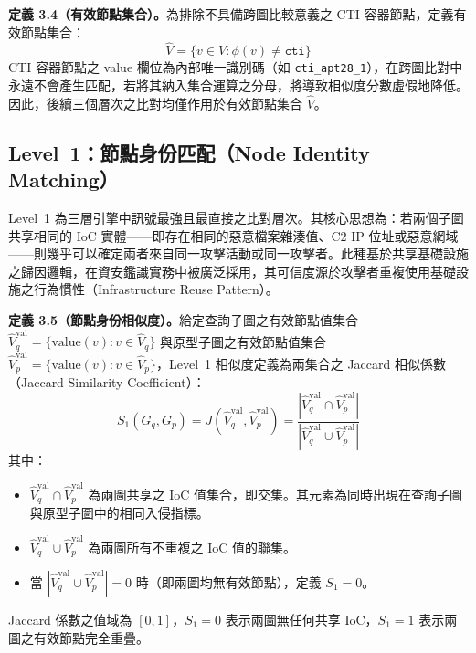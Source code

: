 \begin{ZhChapter}
\noindent\textbf{定義 3.4（有效節點集合）。}為排除不具備跨圖比較意義之 CTI 容器節點，定義有效節點集合：
\begin{equation}
    \hat{V} = \{v \in V : \phi(v) \neq \texttt{cti}\}
    \label{eq:valid-nodes}
\end{equation}
CTI 容器節點之 value 欄位為內部唯一識別碼（如 \texttt{cti\_apt28\_1}），在跨圖比對中永遠不會產生匹配，若將其納入集合運算之分母，將導致相似度分數虛假地降低。因此，後續三個層次之比對均僅作用於有效節點集合 $\hat{V}$。


\subsection{Level~1：節點身份匹配（Node Identity Matching）}
\label{subsec:level1}

Level~1 為三層引擎中訊號最強且最直接之比對層次。其核心思想為：若兩個子圖共享相同的 IoC 實體——即存在相同的惡意檔案雜湊值、C2 IP 位址或惡意網域——則幾乎可以確定兩者來自同一攻擊活動或同一攻擊者。此種基於共享基礎設施之歸因邏輯，在資安鑑識實務中被廣泛採用，其可信度源於攻擊者重複使用基礎設施之行為慣性（Infrastructure Reuse Pattern）。

\noindent\textbf{定義 3.5（節點身份相似度）。}給定查詢子圖之有效節點值集合 $\hat{V}_q^{\text{val}} = \{\text{value}(v) : v \in \hat{V}_q\}$ 與原型子圖之有效節點值集合 $\hat{V}_p^{\text{val}} = \{\text{value}(v) : v \in \hat{V}_p\}$，Level~1 相似度定義為兩集合之 Jaccard 相似係數（Jaccard Similarity Coefficient）：
\begin{equation}
    S_1(G_q, G_p) = J(\hat{V}_q^{\text{val}}, \hat{V}_p^{\text{val}}) = \frac{|\hat{V}_q^{\text{val}} \cap \hat{V}_p^{\text{val}}|}{|\hat{V}_q^{\text{val}} \cup \hat{V}_p^{\text{val}}|}
    \label{eq:level1}
\end{equation}
其中：
\begin{itemize}
    \item $\hat{V}_q^{\text{val}} \cap \hat{V}_p^{\text{val}}$ 為兩圖共享之 IoC 值集合，即交集。其元素為同時出現在查詢子圖與原型子圖中的相同入侵指標。
    \item $\hat{V}_q^{\text{val}} \cup \hat{V}_p^{\text{val}}$ 為兩圖所有不重複之 IoC 值的聯集。
    \item 當 $|\hat{V}_q^{\text{val}} \cup \hat{V}_p^{\text{val}}| = 0$ 時（即兩圖均無有效節點），定義 $S_1 = 0$。
\end{itemize}

Jaccard 係數之值域為 $[0, 1]$，$S_1 = 0$ 表示兩圖無任何共享 IoC，$S_1 = 1$ 表示兩圖之有效節點完全重疊。


\end{ZhChapter}
